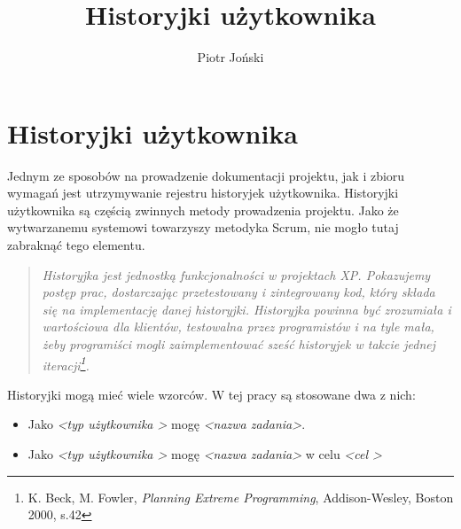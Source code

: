 \documentclass[a4paper,11pt]{article}
\author{Piotr Joński}
\title{Historyjki użytkownika}
\newenvironment{italicquote}
{\begin{quote}\itshape}
{\end{quote}}
\begin{document}
\maketitle
\tableofcontents
\newpage

\section{Historyjki użytkownika}
Jednym ze sposobów na prowadzenie dokumentacji projektu, jak i zbioru wymagań jest utrzymywanie rejestru historyjek użytkownika. Historyjki użytkownika są częścią zwinnych metody prowadzenia projektu. Jako że wytwarzanemu systemowi towarzyszy metodyka Scrum, nie mogło tutaj zabraknąć tego elementu.

\begin{italicquote}
	Historyjka jest jednostką funkcjonalności w projektach XP. Pokazujemy postęp prac, dostarczając przetestowany i zintegrowany kod, który składa się na implementację danej historyjki. Historyjka powinna być zrozumiała i wartościowa dla klientów, testowalna przez programistów i na tyle mała, żeby programiści mogli zaimplementować sześć historyjek w takcie jednej iteracji\footnote{K. Beck, M. Fowler, \textit{Planning Extreme Programming}, Addison-Wesley, Boston 2000, s.42}.
\end{italicquote}

Historyjki mogą mieć wiele wzorców. W tej pracy są stosowane dwa z nich:
\begin{itemize}
	\item Jako \textit{\textless typ użytkownika \textgreater} mogę \textit{\textless nazwa zadania\textgreater}.
	\item Jako \textit{\textless typ użytkownika \textgreater} mogę \textit{\textless nazwa zadania\textgreater} w celu \textit{\textless cel \textgreater}\cite{SCRUM}
\end{itemize} 
\end{document}
